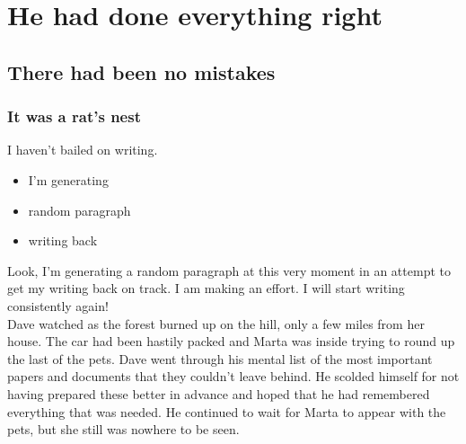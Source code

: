\documentclass{standalone}
\begin{document}
\section{He had done everything right}

\subsection{There had been no mistakes}

\subsubsection{It was a rat's nest}


	I haven't bailed on writing.\\
	
	\begin{itemize}
		\item I'm generating
		\item random paragraph
		\item writing back
	\end{itemize}
	
	Look, I'm generating a random paragraph at this very moment in an attempt to get my writing back on track. I am making an effort. I will start writing consistently again!\\
	
	Dave watched as the forest burned up on the hill, only a few miles from her house. The car had been hastily packed and Marta was inside trying to round up the last of the pets. Dave went through his mental list of the most important papers and documents that they couldn't leave behind. He scolded himself for not having prepared these better in advance and hoped that he had remembered everything that was needed. He continued to wait for Marta to appear with the pets, but she still was nowhere to be seen.	
	
\end{document}
